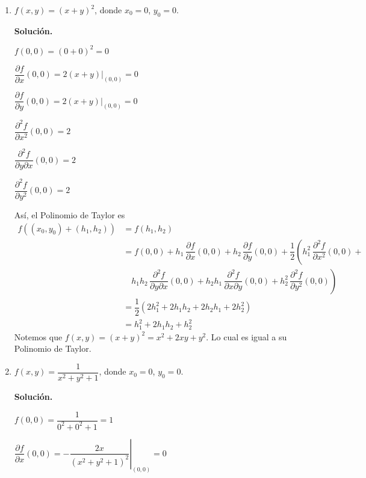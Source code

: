 \documentclass[fleqn, 12pt]{article}
\newcommand{\derivadaparcial}[2]{\dfrac{\partial {#1}}{\partial {#2}}}
\newcommand{\derivadaparcialn}[3]{\dfrac{\partial^{#3} {#1}}{\partial {#2}^{#3}}}
\newcommand{\derivadaparcialnd}[3]{\dfrac{\partial^{2} {#1}}{\partial {#3} \partial {#2}}}
\begin{document}
    \begin{enumerate}
        \item $ f(x,y) = (x + y)^2 $, donde $ x_0 = 0 $, $ y_0 = 0 $.
        
        \textbf{Solución.}

        $ f(0,0) = (0 + 0)^2 = 0 $

        $ \derivadaparcial{f}{x} (0,0) = \left. 2(x + y) \right|_{(0,0)} = 0 $

        $ \derivadaparcial{f}{y} (0,0) = \left. 2(x + y) \right|_{(0,0)} = 0 $

        $ \derivadaparcialn{f}{x}{2} (0,0) = 2 $

        $ \derivadaparcialnd{f}{x}{y} (0,0) = 2 $

        $ \derivadaparcialn{f}{y}{2} (0,0) = 2 $

        Así, el Polinomio de Taylor es
        \begin{align*}
            f((x_0, y_0) + (h_1, h_2)) &= f(h_1, h_2) \\
            &= f(0,0) + h_1 \, \derivadaparcial{f}{x} (0,0) + h_2 \, \derivadaparcial{f}{y} (0,0) + \dfrac{1}{2} \left( h_1^2 \, \derivadaparcialn{f}{x}{2} (0,0) \right. + \\
            & \quad \left. h_1 h_2 \, \derivadaparcialnd{f}{x}{y} (0,0) + h_2 h_1 \, \derivadaparcialnd{f}{y}{x} (0,0) + h_2^2 \, \derivadaparcialn{f}{y}{2} (0,0) \right) \\
            &= \dfrac{1}{2} \left( 2 h_1^2 + 2 h_1 h_2 + 2 h_2 h_1 + 2 h_2^2 \right) \\
            &= h_1^2 + 2 h_1 h_2 + h_2^2
        \end{align*}
        Notemos que $ f(x,y) = (x + y)^2 = x^2 + 2xy + y^2 $. Lo cual es igual a su Polinomio de Taylor.

        \item $ f(x,y) = \dfrac{1}{x^2 + y^2 + 1} $, donde $ x_0 = 0 $, $ y_0 = 0 $.
        
        \textbf{Solución.}

        $ f(0,0) = \dfrac{1}{0^2 + 0^2 + 1} = 1 $

        $ \derivadaparcial{f}{x} (0,0) = \left. - \dfrac{2x}{(x^2 + y^2 + 1)^2} \right|_{(0,0)} = 0 $


\end{enumerate}
\end{document}
